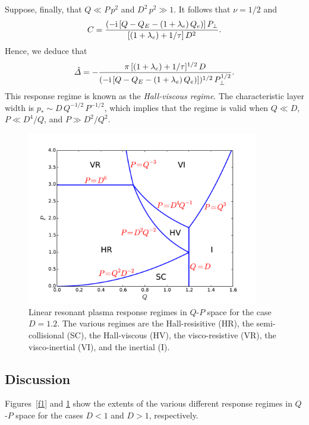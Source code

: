 \documentclass[notitlepage,12pt]{article}
\begin{document}
Suppose, finally, that $Q\ll P\,p^2$ and $D^2\,p^2\gg 1$. It follows that $\nu=1/2$ and
\begin{equation}
C = \frac{(-{\rm i}\,[Q-Q_E-(1+\lambda_e)\,Q_e)]\,P_\perp}{[(1+\lambda_e)+1/\tau]\,D^2}.
\end{equation}
Hence, we deduce that
\begin{equation}
\hat{\mit\Delta}= -\frac{\pi\,[(1+\lambda_e)+1/\tau]^{1/2}\,D}{(-{\rm i}\,[Q-Q_E-(1+\lambda_e)\,Q_e)])^{1/2}\,P_\perp^{1/2}}.
\end{equation}
This response regime is known as the {\em Hall-viscous regime}. The characteristic layer width is $p_\ast\sim
D\,Q^{-1/2}\,P^{-1/2}$, which implies that the regime is valid when $Q\ll D$, $P\ll D^4/Q$, and $P\gg D^2/Q^2$. 

\begin{figure}[t]
\centerline{\includegraphics[width=0.9\textwidth]{RegimeII.pdf}}
\caption{Linear resonant plasma response regimes in $Q$-$P$ space for the case $D=1.2$. The various regimes are
the Hall-resisitive (HR), the semi-collisional (SC), the Hall-viscous (HV), the visco-resistive (VR), the visco-inertial
(VI), and the inertial (I).}\label{f2}
\end{figure}

\subsection{Discussion}\label{dis1}
Figures~\ref{f1} and \ref{f2} show the extents of the various different response regimes in $Q$-$P$ space for the
cases $D<1$ and $D>1$, respectively. 
\end{document}

